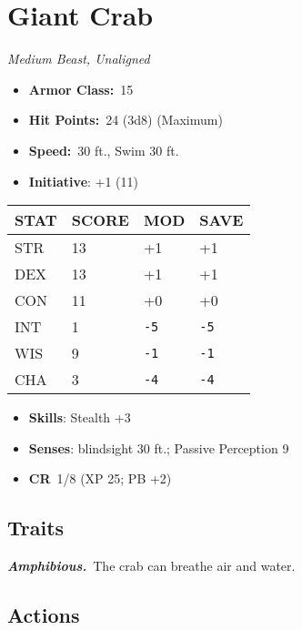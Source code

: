 \documentclass[10pt,twocolumn]{article}
\let\oldtextbf\textbf
\renewcommand{\textbf}[1]{\oldtextbf{{#1}}}
\providecommand{\tightlist}{
  \setlength{\itemsep}{4pt}
  \setlength{\topsep}{0pt}
  \setlength{\parsep}{0pt}
  \setlength{\parskip}{0pt}
  \setlength{\partopsep}{0pt}
}
\begin{document}
\section{Giant Crab}\label{giant-crab}

\emph{Medium Beast, Unaligned}

\setlength{\itemsep}{0pt}

\begin{itemize}
\tightlist
\item
  \textbf{Armor Class:}~15
\item
  \textbf{Hit Points:}~24 (3d8) (Maximum)
\item
  \textbf{Speed:}~30 ft., Swim 30 ft.
\item
  \textbf{Initiative}: +1 (11)
\end{itemize}

\begin{center}
{\sffamily\fontsize{8pt}{8pt}\selectfont
{}
\begin{tabular}{llll}
\toprule
\textbf{STAT} & \textbf{SCORE} & \textbf{MOD} & \textbf{SAVE} \\
\midrule
STR & 13 & +1 & +1 \\
DEX & 13 & +1 & +1 \\
CON & 11 & +0 & +0 \\
INT & 1 & \texttt{-5} & \texttt{-5} \\
WIS & 9 & \texttt{-1} & \texttt{-1} \\
CHA & 3 & \texttt{-4} & \texttt{-4} \\
\bottomrule
\end{tabular}}
\end{center}

\setlength{\itemsep}{0pt}

\begin{itemize}
\tightlist
\item
  \textbf{Skills}: Stealth +3
\item
  \textbf{Senses}: blindsight 30 ft.; Passive Perception 9
\item
  \textbf{CR}~1/8 (XP 25; PB +2)
\end{itemize}

\subsection{Traits}\label{traits-3}

\emph{\textbf{Amphibious.}}~The crab can breathe air and water.

\subsection{Actions}\label{actions-4}
\end{document}
